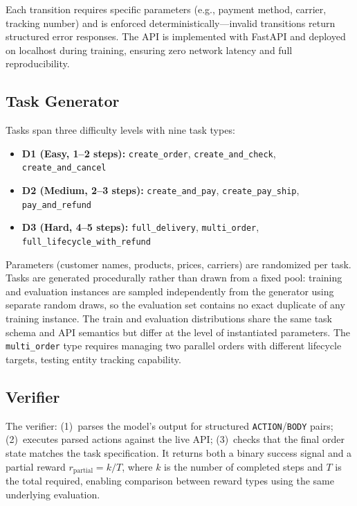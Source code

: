 \documentclass[11pt]{article}
\begin{document}
Each transition requires specific parameters (e.g., payment method, carrier, tracking number) and is enforced deterministically---invalid transitions return structured error responses.
The API is implemented with FastAPI and deployed on localhost during training, ensuring zero network latency and full reproducibility.

\subsection{Task Generator}

Tasks span three difficulty levels with nine task types:
\begin{itemize}[leftmargin=*,itemsep=1pt]
  \item \textbf{D1 (Easy, 1--2 steps):} \texttt{create\_order}, \texttt{create\_and\_check}, \texttt{create\_and\_cancel}
  \item \textbf{D2 (Medium, 2--3 steps):} \texttt{create\_and\_pay}, \texttt{create\_pay\_ship}, \texttt{pay\_and\_refund}
  \item \textbf{D3 (Hard, 4--5 steps):} \texttt{full\_delivery}, \texttt{multi\_order}, \texttt{full\_lifecycle\_with\_refund}
\end{itemize}

Parameters (customer names, products, prices, carriers) are randomized per task.
Tasks are generated procedurally rather than drawn from a fixed pool: training and evaluation instances are sampled independently from the generator using separate random draws, so the evaluation set contains no exact duplicate of any training instance.
The train and evaluation distributions share the same task schema and API semantics but differ at the level of instantiated parameters.
The \texttt{multi\_order} type requires managing two parallel orders with different lifecycle targets, testing entity tracking capability.

\subsection{Verifier}

The verifier: (1)~parses the model's output for structured \texttt{ACTION}/\texttt{BODY} pairs; (2)~executes parsed actions against the live API; (3)~checks that the final order state matches the task specification.
It returns both a binary success signal and a partial reward $r_{\text{partial}} = k / T$, where $k$ is the number of completed steps and $T$ is the total required, enabling comparison between reward types using the same underlying evaluation.
\end{document}
